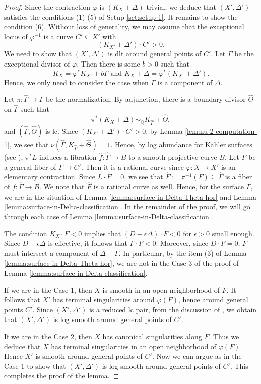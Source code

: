 \documentclass[12pt]{amsart}
\newcommand{\<}{\leq}
\newcommand{\D}{\Delta}
\theoremstyle{remark}
\theoremstyle{definition}
\theoremstyle{definition}
\numberwithin{equation}{section}
\theoremstyle{definition}
\theoremstyle{definition}
\begin{document}
\begin{proof}
Since the contraction $\varphi$ is $(K_X+\D)$-trivial, we deduce that $(X', \D')$ satisfies the conditions (1)-(5) of Setup \ref{set:setup-1}.  
It remains to show the condition (6). 
Without loss of generality, we may assume that the exceptional locus of $\varphi^{-1}$ is a curve $C'\subseteq X'$ with 
\[ (K_{X'}+\D') \cdot C' >0. \]
We need to show that $(X', \D')$ is dlt around general points of $C'$. 
Let $\Gamma$ be the exceptional divisor of $\varphi$. 
Then there is some $b>0$ such that 
\[ K_X=\varphi^*K_{X'} +b\Gamma \mbox{ and }  K_X+\D = \varphi^*(K_{X'}+\D') .\]
Hence, we only need to consider the case when $\Gamma$ is a component of $\D$. 

Let $\pi\colon \widehat{\Gamma} \to \Gamma$ be the normalization. 
By adjunction, there is a boundary divisor $\widehat{\Theta}$ on $\widehat{\Gamma}$ such that 
\[
\pi^*(K_X+\D) \sim_{\mathbb{Q}} K_{\widehat{\Gamma}} + \widehat{\Theta}, 
\]
and $(\widehat{\Gamma}, \widehat{\Theta})$ is lc. 
Since $(K_{X'}+\D') \cdot C' >0$, by Lemma \ref{lem:nu-2-computation-1},  
we see that $\nu(\widehat{\Gamma}, K_{\widehat{\Gamma}}+\widehat{\Theta}) =1$. 
Hence, by log abundance for K\"ahler surfaces (see \cite[Theorem 6.3]{DasOu2022}), 
$\pi^*L$ induces a fibration $\hat{f}\colon \widehat{\Gamma} \to B$ to a smooth projective curve $B$. 
Let $F$ be a general fiber of $\Gamma \to C'$. 
Then it is a rational curve since $\varphi\colon X\to X'$ is an elementary contraction. 
Since $L\cdot F= 0$, we see that  $\widehat{F}:= \pi^{-1}(F)\subseteq \widehat{\Gamma}$ is a  fiber of $f\colon \widehat{\Gamma} \to B$.    We note that $\widehat F$ is a rational curve as well.  
Hence, for the surface $\Gamma$, we are in the situation of Lemma \ref{lemma:surface-in-Delta-Theta-hor} and Lemma \ref{lemma:surface-in-Delta-classification}.  
In the remainder of the proof,  we will go through each case of   Lemma \ref{lemma:surface-in-Delta-classification}. 

The condition $K_X\cdot F <0$ implies that $(D-\epsilon \D) \cdot F<0$   for $\epsilon>0$ small enough. 
Since $D-\epsilon \D$ is effective, it follows that $\Gamma\cdot F<0$. 
Moreover, since $D\cdot F=0$, $F$ must intersect a component of $\D-\Gamma$. 
In particular, by the item (3) of Lemma \ref{lemma:surface-in-Delta-Theta-hor}, we are not in the Case 3 of the proof of Lemma \ref{lemma:surface-in-Delta-classification}. 

If we are in the Case 1, then $X$ is   smooth in an open neighborhood of $F$. 
It follows that $X'$ has terminal singularities around $\varphi(F)$, hence around general points $C'$. 
Since $(X',\D')$ is a reduced lc pair, from the discussion of \cite[Proposition 16.6]{Kol92}, 
we obtain that $(X', \D')$ is log smooth around general points of $C'$. 

If we are in the Case 2, then $X$ has canonical singularities along  $F$. 
Thus we deduce that $X$ has terminal singularities in an open neighborhood of $\varphi(F)$. 
Hence $X'$ is smooth around general points of $C'$. 
Now we can argue as in the Case 1 to show that $(X', \D')$ is log smooth around general points of $C'$.  
This completes the proof of the lemma. 
\end{proof}
\end{document}
